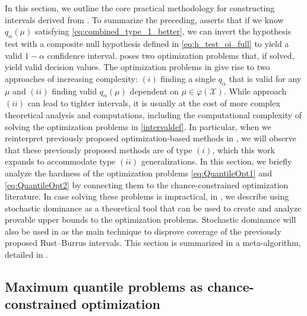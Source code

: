 \documentclass[11pt]{article}
\numberwithin{equation}{section}
\numberwithin{figure}{section}
\begin{document}
In this section, we outline the core practical methodology for constructing intervals derived from . 
To summarize the preceding,  asserts that if we know $q_\alpha(\mu)$ satisfying \eqref{eq:combined_type_1_better}, we can invert the hypothesis test with a composite null hypothesis defined in \eqref{eq:h_test_oi_full} to yield a valid $1 - \alpha$ confidence interval.
 poses two optimization problems that, if solved, yield valid decision values. 
The optimization problems in  give rise to two approaches of increasing complexity: $(i)$ finding a single $q_\alpha$ that is valid for any $\mu$ and $(ii)$ finding valid $q_\alpha(\mu)$ dependent on $\mu \in \mathcal{\varphi(\mathcal X)}$. 
While approach $(ii)$ can lead to tighter intervals, it is usually at the cost of more complex theoretical analysis and computations, including the computational complexity of solving the optimization problems in \eqref{intervaldef}. 
In particular, when we reinterpret previously proposed optimization-based methods in , we will observe that these previously proposed methods are of type $(i)$, which this work expands to accommodate type $(ii)$ generalizations. 
In this section, we briefly analyze the hardness of the optimization problems \eqref{eq:QuantileOpt1} and \eqref{eq:QuantileOpt2} by connecting them to the chance-constrained optimization literature. 
In case solving these problems is impractical, in , we describe using stochastic dominance as a theoretical tool that can be used to create and analyze provable upper bounds to the optimization problems. 
Stochastic dominance will also be used in  as the main technique to disprove coverage of the previously proposed Rust--Burrus intervals. This section is summarized in a meta-algorithm, detailed in .

\subsection[Computational ways to compute quantile levels via optimization]{Maximum quantile problems as chance-constrained optimization}\label{subsec:CCO}
\end{document}
